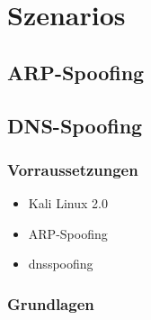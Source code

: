 \chapter{Szenarios}

\section{ARP-Spoofing}

\section{DNS-Spoofing}

\subsection*{Vorraussetzungen}

\begin{itemize}
\item Kali Linux 2.0
\item ARP-Spoofing
\item dnsspoofing
\end{itemize}


\subsection*{Grundlagen}

